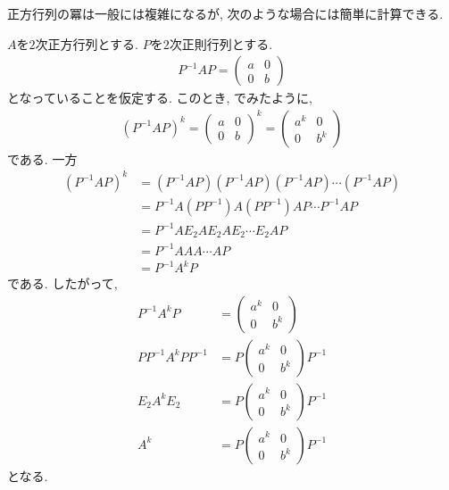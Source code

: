 正方行列の冪は一般には複雑になるが,
次のような場合には簡単に計算できる.
\begin{example}
  \label{ex:diagonalizedpow}
  $A$を$2$次正方行列とする.
  $P$を$2$次正則行列とする.
  \begin{align*}
    P^{-1}AP=
    \begin{pmatrix}
      a&0\\
      0&b
      \end{pmatrix}
  \end{align*}
  となっていることを仮定する.
  このとき,
  でみたように,
  \begin{align*}
    (P^{-1}AP)^k=
    \begin{pmatrix}
      a&0\\
      0&b
    \end{pmatrix}^k
    =
    \begin{pmatrix}
      a^k&0\\
      0&b^k
      \end{pmatrix}
  \end{align*}
  である. 一方
  \begin{align*}
    (P^{-1}AP)^k
    &= (P^{-1}AP)(P^{-1}AP)(P^{-1}AP)\cdots (P^{-1}AP)\\
    &= P^{-1}A(PP^{-1})A(PP^{-1})AP\cdots P^{-1}AP\\
    &= P^{-1}AE_2AE_2AE_2\cdots E_2AP\\
    &= P^{-1}AAA\cdots AP\\
    &= P^{-1}A^k P
  \end{align*}
  である.
  したがって,
  \begin{align*}
   P^{-1}A^k P&=
    \begin{pmatrix}
      a^k&0\\
      0&b^k
    \end{pmatrix}
    \\
   PP^{-1}A^k PP^{-1}&=
   P \begin{pmatrix}
      a^k&0\\
      0&b^k
    \end{pmatrix}P^{-1}
  \\
   E_2A^k E_2&=
   P \begin{pmatrix}
      a^k&0\\
      0&b^k
    \end{pmatrix}P^{-1}
  \\
   A^k &=
   P \begin{pmatrix}
      a^k&0\\
      0&b^k
    \end{pmatrix}P^{-1}
  \end{align*}
  となる.
\end{example}
